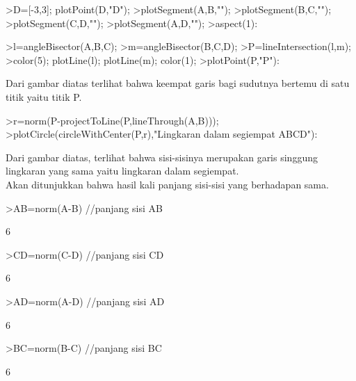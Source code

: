 \documentclass[a4paper,10pt]{article}
\begin{document}
\begin{eulernotebook}
\begin{eulercomment}
\begin{eulercomment}
\begin{eulercomment}
\begin{eulercomment}
\begin{eulercomment}
\begin{eulercomment}
\begin{eulercomment}
\begin{eulercomment}
\begin{eulercomment}
\begin{eulercomment}
\begin{eulercomment}
\begin{eulercomment}
\begin{eulercomment}
\begin{eulercomment}
\begin{eulercomment}
\begin{eulercomment}
\begin{eulercomment}
\begin{eulercomment}
\begin{eulerprompt}
>D=[-3,3]; plotPoint(D,"D");
>plotSegment(A,B,"");
>plotSegment(B,C,"");
>plotSegment(C,D,"");
>plotSegment(A,D,"");
>aspect(1):
\end{eulerprompt}
\begin{eulerprompt}
>l=angleBisector(A,B,C);
>m=angleBisector(B,C,D);
>P=lineIntersection(l,m);
>color(5); plotLine(l); plotLine(m); color(1);
>plotPoint(P,"P"):
\end{eulerprompt}
\begin{eulercomment}
Dari gambar diatas terlihat bahwa keempat garis bagi sudutnya bertemu
di satu titik yaitu titik P.
\end{eulercomment}
\begin{eulerprompt}
>r=norm(P-projectToLine(P,lineThrough(A,B)));
>plotCircle(circleWithCenter(P,r),"Lingkaran dalam segiempat ABCD"):
\end{eulerprompt}
\begin{eulercomment}
Dari gambar diatas, terlihat bahwa sisi-sisinya merupakan garis
singgung lingkaran yang sama yaitu lingkaran dalam segiempat.\\
Akan ditunjukkan bahwa hasil kali panjang sisi-sisi yang berhadapan
sama.
\end{eulercomment}
\begin{eulerprompt}
>AB=norm(A-B) //panjang sisi AB
\end{eulerprompt}
\begin{euleroutput}
  6
\end{euleroutput}
\begin{eulerprompt}
>CD=norm(C-D) //panjang sisi CD
\end{eulerprompt}
\begin{euleroutput}
  6
\end{euleroutput}
\begin{eulerprompt}
>AD=norm(A-D) //panjang sisi AD
\end{eulerprompt}
\begin{euleroutput}
  6
\end{euleroutput}
\begin{eulerprompt}
>BC=norm(B-C) //panjang sisi BC
\end{eulerprompt}
\begin{euleroutput}
  6
\end{euleroutput}
\begin{eulerprompt}

\end{eulerprompt}
\end{eulercomment}
\end{eulercomment}
\end{eulercomment}
\end{eulercomment}
\end{eulercomment}
\end{eulercomment}
\end{eulercomment}
\end{eulercomment}
\end{eulercomment}
\end{eulercomment}
\end{eulercomment}
\end{eulercomment}
\end{eulercomment}
\end{eulercomment}
\end{eulercomment}
\end{eulercomment}
\end{eulercomment}
\end{eulercomment}
\end{eulernotebook}
\end{document}

